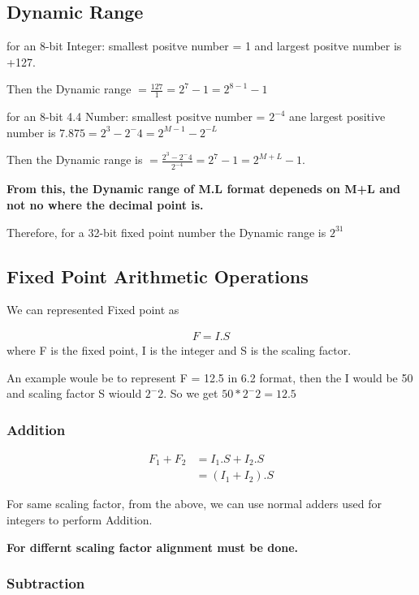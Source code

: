 \documentclass{article}
\begin{document}
\subsection{Dynamic Range}
for an 8-bit Integer: smallest positve number = 1 and largest positve number is +127.

Then the Dynamic range $ = \frac{127}{1} = 2^7-1 = 2^{8-1} - 1$

for an 8-bit 4.4 Number: smallest positve number = $2^{-4}$ ane largest positive number is $7.875 = 2^3 - 2^-4 = 2^{M-1} - 2^{-L}$

Then the Dynamic range is $=\frac{2^3 - 2^-4}{2^{-4}} = 2^7 - 1 = 2^{M+L}-1$.

\textbf{From this, the Dynamic range of M.L format depeneds on M+L and not no where the decimal point is.}


Therefore, for a 32-bit fixed point number the Dynamic range is $2^{31}$


\subsection{Fixed Point Arithmetic Operations}
We can represented Fixed point as

\begin{align*}
    F = I . S
\end{align*}
where F is the fixed point, I is the integer and S is the scaling factor.

An example woule be to represent F = 12.5 in 6.2 format, then the I would be 50 and scaling factor S wiould $2^-2$.
So we get $50*2^-2 = 12.5$


\subsubsection{Addition}


\begin{align*}
    F_1 + F_2 & = I_1.S + I_2.S \\
              & = (I_1 + I_2).S
\end{align*}

For same scaling factor, from the above, we can use normal adders used for integers to perform Addition.

\textbf{For differnt scaling factor alignment must be done.}

\subsubsection{Subtraction}
\end{document}

